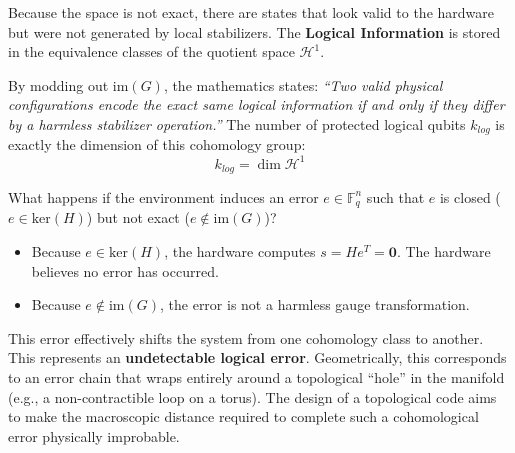 \documentclass[11pt, a4paper, twoside]{article}
\newcommand{\F}{\mathbb{F}}
\newcommand{\im}{\text{im}}
\newcommand{\kerop}{\text{ker}}
\newcommand{\cH}{\mathcal{H}}
\begin{document}
		Because the space is not exact, there are states that look valid to the hardware but were not generated by local stabilizers. The \textbf{Logical Information} is stored in the equivalence classes of the quotient space $\cH^1$.
		
		By modding out $\im(G)$, the mathematics states: \textit{``Two valid physical configurations encode the exact same logical information if and only if they differ by a harmless stabilizer operation.''} 
		The number of protected logical qubits $k_{log}$ is exactly the dimension of this cohomology group:
		$$ k_{log} = \dim \cH^1 $$
	
	\vspace{1em}
	
	\begin{conceptbox}
		What happens if the environment induces an error $e \in \F_q^n$ such that $e$ is closed ($e \in \kerop(H)$) but not exact ($e \notin \im(G)$)?
		\begin{itemize}
			\item Because $e \in \kerop(H)$, the hardware computes $s = He^T = \mathbf{0}$. The hardware believes no error has occurred.
			\item Because $e \notin \im(G)$, the error is not a harmless gauge transformation.
		\end{itemize}
		This error effectively shifts the system from one cohomology class to another. This represents an \textbf{undetectable logical error}. Geometrically, this corresponds to an error chain that wraps entirely around a topological ``hole'' in the manifold (e.g., a non-contractible loop on a torus). The design of a topological code aims to make the macroscopic distance required to complete such a cohomological error physically improbable.
	\end{conceptbox}
	
\end{document}
